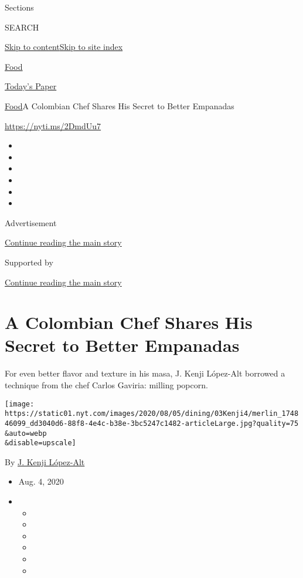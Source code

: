 Sections

SEARCH

\protect\hyperlink{site-content}{Skip to
content}\protect\hyperlink{site-index}{Skip to site index}

\href{https://www.nytimes.com/section/food}{Food}

\href{https://myaccount.nytimes.com/auth/login?response_type=cookie\&client_id=vi}{}

\href{https://www.nytimes.com/section/todayspaper}{Today's Paper}

\href{/section/food}{Food}\textbar{}A Colombian Chef Shares His Secret
to Better Empanadas

\url{https://nyti.ms/2DmdUu7}

\begin{itemize}
\item
\item
\item
\item
\item
\item
\end{itemize}

Advertisement

\protect\hyperlink{after-top}{Continue reading the main story}

Supported by

\protect\hyperlink{after-sponsor}{Continue reading the main story}

\hypertarget{a-colombian-chef-shares-his-secret-to-better-empanadas}{%
\section{A Colombian Chef Shares His Secret to Better
Empanadas}\label{a-colombian-chef-shares-his-secret-to-better-empanadas}}

For even better flavor and texture in his masa, J. Kenji López-Alt
borrowed a technique from the chef Carlos Gaviria: milling popcorn.

\texttt{[image: https://static01.nyt.com/images/2020/08/05/dining/03Kenji4/merlin\_174846099\_dd3040d6-88f8-4e4c-b38e-3bc5247c1482-articleLarge.jpg?quality=75\\\&auto=webp\\\&disable=upscale]}

By \href{https://www.nytimes.com/by/j-kenji-lopez-alt}{J. Kenji
López-Alt}

\begin{itemize}
\item
  Aug. 4, 2020
\item
  \begin{itemize}
  \item
  \item
  \item
  \item
  \item
  \item
  \end{itemize}
\end{itemize}

